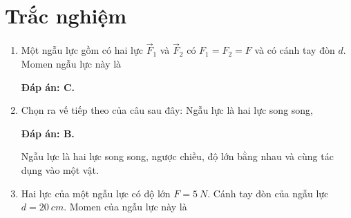 \whiteBGstarBegin
\setcounter{section}{0}
\section{Trắc nghiệm}
\begin{enumerate}[label=\bfseries Câu \arabic*:]
	
	\item {}
	
	\cauhoi
	{Một ngẫu lực gồm có hai lực $\vec F_1$ và $\vec F_2$ có $F_1 = F_2 = F$ và có cánh tay đòn $d$. Momen ngẫu lực này là
	}
	
	\loigiai
	{	\textbf{Đáp án: C.}
			
	}
	\item {}
	
	\cauhoi
	{Chọn ra vế tiếp theo của câu sau đây: Ngẫu lực là hai lực song song,
	}
	
	\loigiai
	{	\textbf{Đáp án: B.}
		
		Ngẫu lực là hai lực song song, ngược chiều, độ lớn bằng nhau và cùng tác dụng vào một vật.
	}
	
	\item {}
	
	\cauhoi
	{Hai lực của một ngẫu lực có độ lớn $F=\SI{5}{N}$. Cánh tay đòn của ngẫu lực $d=\SI{20}{cm}$. Momen của ngẫu lực này là
	}
	

\end{enumerate}
